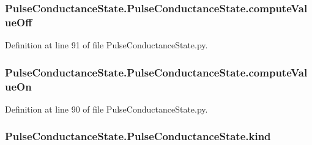 \subsubsection[{\texorpdfstring{compute\+Value\+Off}{computeValueOff}}]{\setlength{\rightskip}{0pt plus 5cm}Pulse\+Conductance\+State.\+Pulse\+Conductance\+State.\+compute\+Value\+Off}\hypertarget{class_pulse_conductance_state_1_1_pulse_conductance_state_a89e0cc154bd699aee7529574a8fe556c}{}\label{class_pulse_conductance_state_1_1_pulse_conductance_state_a89e0cc154bd699aee7529574a8fe556c}


Definition at line 91 of file Pulse\+Conductance\+State.\+py.

\subsubsection[{\texorpdfstring{compute\+Value\+On}{computeValueOn}}]{\setlength{\rightskip}{0pt plus 5cm}Pulse\+Conductance\+State.\+Pulse\+Conductance\+State.\+compute\+Value\+On}\hypertarget{class_pulse_conductance_state_1_1_pulse_conductance_state_a7f6710b9f97ac5879888402cd5ed15d4}{}\label{class_pulse_conductance_state_1_1_pulse_conductance_state_a7f6710b9f97ac5879888402cd5ed15d4}


Definition at line 90 of file Pulse\+Conductance\+State.\+py.

\subsubsection[{\texorpdfstring{kind}{kind}}]{\setlength{\rightskip}{0pt plus 5cm}Pulse\+Conductance\+State.\+Pulse\+Conductance\+State.\+kind}\hypertarget{class_pulse_conductance_state_1_1_pulse_conductance_state_a53d237daaa4815ad375e2377da89845e}{}\label{class_pulse_conductance_state_1_1_pulse_conductance_state_a53d237daaa4815ad375e2377da89845e}


